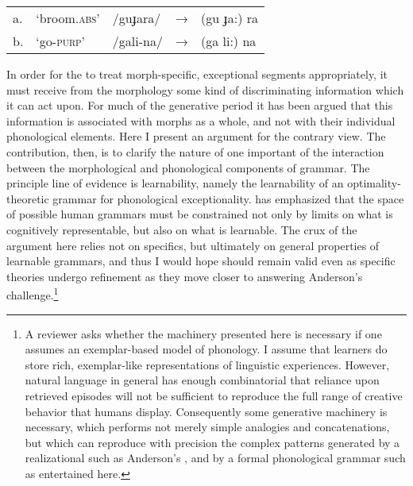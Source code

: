 \documentclass[output=paper,
modfonts
]{LSP/langsci}
\begin{document}
\ex \label{ex:round:2}
\begin{tabular}[t]{@{}lllll}
a. & `broom.\textsc{abs}' & /guɟara/ & → & (gu ɟa:) ra \\
b. & `go-\textsc{purp}' & /gali-na/  & → & (ga li:) na\\
\end{tabular}
\z

\noindent In order for the  to treat morph-specific, exceptional segments appropriately, it must receive from the morphology some kind of discriminating information which it can act upon. For much of the generative period it has been argued that this information is associated with morphs as a whole, and not with their individual phonological elements. Here I present an argument for the contrary view. The contribution, then, is to clarify the nature of one important  of the interaction between the morphological and phonological components of grammar. The principle line of evidence is learnability, namely the learnability of an optimality-theoretic grammar for phonological exceptionality. \citet{anderson2008} has emphasized that the space of possible human grammars must be constrained not only by limits on what is cognitively representable, but also on what is learnable. The crux of the argument here relies not on specifics, but ultimately on general properties of learnable grammars, and thus I would hope should remain valid even as specific theories undergo refinement as they move closer to answering Anderson's \citeyearpar{anderson2008} challenge.\footnote{A reviewer asks whether the machinery presented here is necessary if one assumes an exemplar-based model of phonology. I assume that learners do store rich, exemplar-like representations of linguistic experiences. However, natural language  in general has enough combinatorial  that reliance upon retrieved episodes will not be sufficient to reproduce the full range of creative behavior that humans display. Consequently some generative machinery is necessary, which performs not merely simple analogies and concatenations, but which can reproduce with precision the complex patterns generated by a realizational  such as Anderson's \citeyearpar{anderson1992}, and by a formal phonological grammar such as entertained here.}
\end{document}
